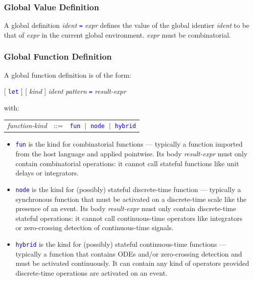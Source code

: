\documentclass[11pt,titlepage,twoside]{report}
\newcommand{\alt}{\;|\;}
\newcommand{\term}[1]{\textcolor{Blue}{\tt #1}}
\newcommand{\nterm}[1]{\textcolor{BrickRed}{\it #1}}
\newcommand{\term}[1]{{\tt #1}}
\newcommand{\nterm}[1]{{\em #1}}
\begin{document}
\subsubsection{Global Value Definition}

A global definition \nterm{ident} \term{=} \nterm{expr} defines the value
of the global identier \nterm{ident} to be that of \nterm{expr} in the
current global environment. \nterm{expr} must be combinatorial.

\subsubsection{Global Function Definition}

A global function definition is of the form:
\begin{center}
  [ \term{let} ] [ \nterm{kind} ] \nterm{ident} \nterm{pattern} \term{=}
                    \nterm{result-expr}
\end{center}
with:
\begin{center}
  \begin{tabular}{lcl}
    \nterm{function-kind} & ::=  & \term{fun} $\alt$ \term{node}
                                              $\alt$ \term{hybrid}
\end{tabular}
\end{center}

\begin{itemize}
\item
  \term{fun} is the kind for combinatorial functions --- typically a
  function imported from the host language and applied pointwise. Its
  body \nterm{result-expr} must only contain combinatorial operations:
  it cannot call stateful functions like unit delays or integrators.
\item
  \term{node} is the kind for (possibly) stateful discrete-time
  function --- typically a synchronous function that must be activated
  on a discrete-time scale like the presence of an event. Its body
  \nterm{result-expr} must only contain discrete-time stateful
  operations: it cannot call continuous-time operators like
  integrators or zero-crossing detection of continuous-time signals.
\item
  \term{hybrid} is the kind for (possibly) stateful continuous-time
  functions --- typically a function that contains ODEs and/or
  zero-crossing detection and must be activated continuously. It can
  contain any kind of operators provided discrete-time operations are activated
  on an event.
\end{itemize}
\end{document}
